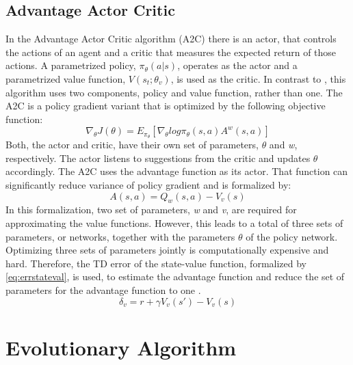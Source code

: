 \subsection[head={A2C}, tocentry={Advantage Actor Critic}, reference={A2C}]{Advantage Actor Critic} \label{ssec:a2c}
In the Advantage Actor Critic algorithm (A2C) there is an actor, that controls the actions of an agent and a critic that measures the expected return of those actions. A parametrized policy, \(\pi_{\theta}(a|s)\), operates as the actor and a parametrized value function, \(V(s_{t};\theta_{v})\), is used as the critic. In contrast to , this algorithm uses two components, policy and value function, rather than one. The A2C is a policy gradient variant that is optimized by the following objective function: 
\begin{equation}
\nabla_{\theta}J(\theta)=E_{\pi_{\theta}}[\nabla_{\theta}log\pi_{\theta}(s,a) A^{w}(s,a)]
\label{eq:a2c}
\end{equation}
Both, the actor and critic, have their own set of parameters, \(\theta\) and \textit{w}, respectively. The actor listens to suggestions from the critic and updates \(\theta\) accordingly. The A2C uses the advantage function as its actor. That function can significantly reduce variance of policy gradient and is formalized by:
\begin{equation}
A(s,a)=Q_{w}(s,a)-V_{v}(s)
\label{eq:advfunc}
\end{equation}
In this formalization, two set of parameters, \textit{w} and \textit{v}, are required for approximating the value functions. However, this leads to a total of three sets of parameters, or networks, together with the parameters \(\theta\) of the policy network. Optimizing three sets of parameters jointly is computationally expensive and hard. Therefore, the TD error of the state-value function, formalized by \ref{eq:errstateval}, is used, to estimate the advantage function and reduce the set of parameters for the advantage function to one \cite{2016arXiv160201783M}.
\begin{equation}
\delta_{v}=r+\gamma V_{v}(s')-V_{v}(s)
\label{eq:errstateval}
\end{equation}

\section{Evolutionary Algorithm}

